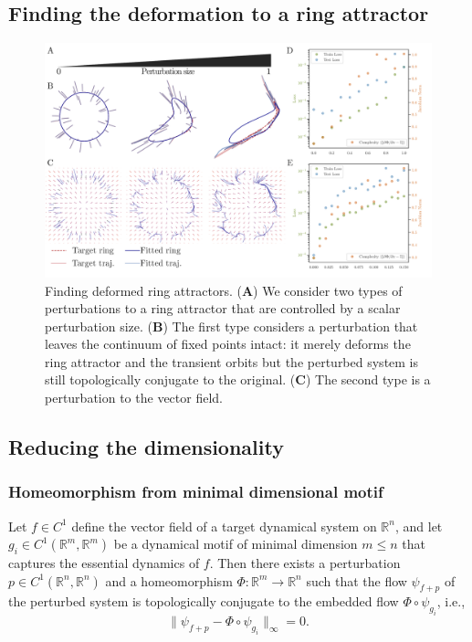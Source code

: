 \documentclass{article}
\theoremstyle{definition} \newtheorem{definition}{Definition}  \newtheorem{example}{Example}
\theoremstyle{remark} \newtheorem{remark}{Remark}
\newcounter{ct}
\begin{document}
\subsection{Finding the deformation to a ring attractor}
\begin{figure}[htbp]
    \centering
    \includegraphics[width=.9\linewidth]{ring_pert_fig}
    \caption{Finding deformed ring attractors. 
    (\textbf{A}) We consider two types of perturbations to a ring attractor that are controlled by a scalar perturbation size.
    (\textbf{B}) The first type considers a perturbation that leaves the continuum of fixed points intact: it merely deforms the ring attractor and the transient orbits but the perturbed system is still topologically conjugate to the original.
    (\textbf{C}) The second type is a perturbation to the vector field. 
    }
    \label{fig:ring_pert_fig}
\end{figure}





\subsection{Reducing the dimensionality} %
\subsubsection{Homeomorphism from minimal dimensional motif}
Let \( f \in C^1 \) define the vector field of a target dynamical system on \( \mathbb{R}^n \), and let \( g_i \in C^1(\mathbb{R}^m, \mathbb{R}^m) \) be a dynamical motif of minimal dimension \( m \leq n \) that captures the essential dynamics of \( f \). Then there exists a perturbation \( p \in C^1(\mathbb{R}^n, \mathbb{R}^n) \) and a homeomorphism \( \Phi: \mathbb{R}^m \to \mathbb{R}^n \) such that the flow \( \psi_{f+p} \) of the perturbed system is topologically conjugate to the embedded flow \( \Phi \circ \psi_{g_i} \), i.e.,
\begin{equation}\label{eq:hom_from_motif}
\|\psi_{f+p} - \Phi \circ \psi_{g_i} \|_\infty = 0.
\end{equation}
\end{document}
